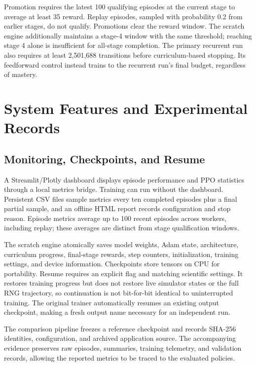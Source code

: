 \documentclass[conference]{IEEEtran}
\begin{document}
Promotion requires the latest 100 qualifying episodes at the current stage to average at least 35 reward. Replay episodes, sampled with probability 0.2 from earlier stages, do not qualify. Promotions clear the reward window. The scratch engine additionally maintains a stage-4 window with the same threshold; reaching stage 4 alone is insufficient for all-stage completion. The primary recurrent run also requires at least 2,501,688 transitions before curriculum-based stopping. Its feedforward control instead trains to the recurrent run's final budget, regardless of mastery.

\section{System Features and Experimental Records}
\subsection{Monitoring, Checkpoints, and Resume}
A Streamlit/Plotly dashboard displays episode performance and PPO statistics through a local metrics bridge. Training can run without the dashboard. Persistent CSV files sample metrics every ten completed episodes plus a final partial sample, and an offline HTML report records configuration and stop reason. Episode metrics average up to 100 recent episodes across workers, including replay; these averages are distinct from stage qualification windows.

The scratch engine atomically saves model weights, Adam state, architecture, curriculum progress, final-stage rewards, step counters, initialization, training settings, and device information. Checkpoints store tensors on CPU for portability. Resume requires an explicit flag and matching scientific settings. It restores training progress but does not restore live simulator states or the full RNG trajectory, so continuation is not bit-for-bit identical to uninterrupted training. The original trainer automatically resumes an existing output checkpoint, making a fresh output name necessary for an independent run.

The comparison pipeline freezes a reference checkpoint and records SHA-256 identities, configuration, and archived application source. The accompanying evidence preserves raw episodes, summaries, training telemetry, and validation records, allowing the reported metrics to be traced to the evaluated policies.
\end{document}
